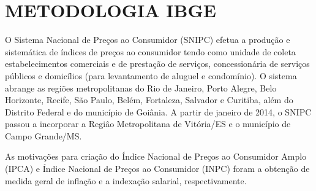 \appendix

\chapter{METODOLOGIA IBGE}\label{ap1}

O Sistema Nacional de Preços ao Consumidor (SNIPC) efetua a produção e sistemática de índices de preços ao consumidor tendo como unidade de coleta estabelecimentos comerciais e de prestação de serviços, concessionária de serviços públicos e domicílios (para levantamento de aluguel e condomínio). O sistema abrange as regiões metropolitanas do Rio de Janeiro, Porto Alegre, Belo Horizonte, Recife, São Paulo, Belém, Fortaleza, Salvador e Curitiba, além do Distrito Federal e do município de Goiânia. A partir de janeiro de 2014, o SNIPC passou a incorporar a Regiâo Metropolitana de Vitória/ES e o município de Campo Grande/MS. 

As motivações para criação do Índice Nacional de Preços ao Consumidor Amplo (IPCA) e Índice Nacional de Preços ao Consumidor (INPC) foram a obtenção de medida geral de inflação e a indexação salarial, respectivamente.

